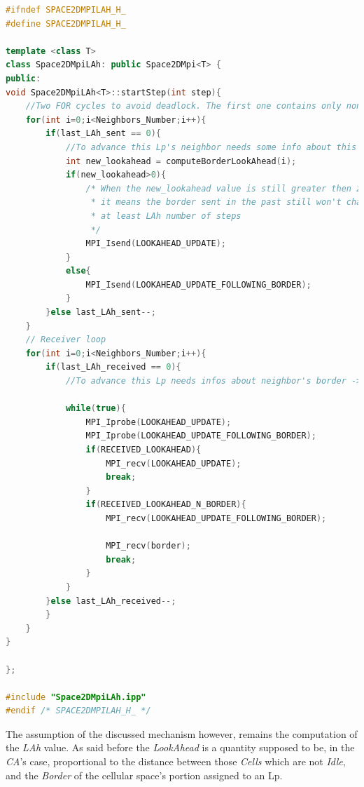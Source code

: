 \documentclass[12pt,a4paper,fleqn]{report}
\begin{document}
\newpage
\begin{lstlisting}[language=C++,
                   directivestyle={\color{black}},
                   emph={int,char,double,float,unsigned},
                   emphstyle={\color{blue}},
                   caption={Space2DMpiLAh.h::\textbf{startStep(int step)}, implementation of the first part of the algorithm},
                   captionpos=b
                  ]
#ifndef SPACE2DMPILAH_H_
#define SPACE2DMPILAH_H_

template <class T>
class Space2DMpiLAh: public Space2DMpi<T> {
public:
void Space2DMpiLAh<T>::startStep(int step){
	//Two FOR cycles to avoid deadlock. The first one contains only non-blocking send
	for(int i=0;i<Neighbors_Number;i++){
		if(last_LAh_sent == 0){
			//To advance this Lp's neighbor needs some info about this Lp's border
			int new_lookahead = computeBorderLookAhead(i);
			if(new_lookahead>0){
				/* When the new_lookahead value is still greater then zero,
				 * it means the border sent in the past still won't change for
				 * at least LAh number of steps
				 */
				MPI_Isend(LOOKAHEAD_UPDATE);
			}
			else{
				MPI_Isend(LOOKAHEAD_UPDATE_FOLLOWING_BORDER);
			}
		}else last_LAh_sent--;
	}
	// Receiver loop
	for(int i=0;i<Neighbors_Number;i++){
		if(last_LAh_received == 0){
			//To advance this Lp needs infos about neighbor's border -> SEND
			
			while(true){
				MPI_Iprobe(LOOKAHEAD_UPDATE);
				MPI_Iprobe(LOOKAHEAD_UPDATE_FOLLOWING_BORDER);
				if(RECEIVED_LOOKAHEAD){
					MPI_recv(LOOKAHEAD_UPDATE);
					break;
				}
				if(RECEIVED_LOOKAHEAD_N_BORDER){
					MPI_recv(LOOKAHEAD_UPDATE_FOLLOWING_BORDER);
					
					MPI_recv(border);
					break;
				}
			}
		}else last_LAh_received--;
		}
	}
}

};

#include "Space2DMpiLAh.ipp"
#endif /* SPACE2DMPILAH_H_ */

\end{lstlisting}
\newpage
The assumption of the discussed mechanism however, remains the computation of the \textit{LAh} value. As said before the \textit{LookAhead} is a quantity supposed to be, in the \textit{CA}'s case, proportional to the distance between those \textit{Cells} which are not \textit{Idle}, and the \textit{Border} of the cellular space's portion assigned to an Lp. \\
\end{document}
